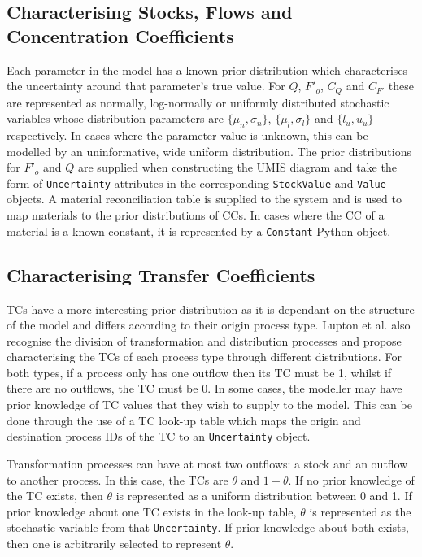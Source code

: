 \documentclass[ %
                    author={Tom Jager},
                supervisor={Dr. Daniel Schien},
                    degree={MEng},
                     title={A Bayesian Inference Engine for Calibrating Uncertainty over UMIS Structured MFA Systems},
                  subtitle={},
                      type={research},
                      year={2019} ]{dissertation}
\begin{document}
\subsection{Characterising Stocks, Flows and Concentration Coefficients}
\label{sec:characterising_stocks_and_flows_and_ccs}
Each parameter in the model has a known prior distribution which characterises the uncertainty around that parameter's true value. For $Q$, $F'_o$, $C_{Q}$ and $C_{F'}$ these are represented as normally, log-normally or uniformly distributed stochastic variables whose distribution parameters are $\{\mu_n, \sigma_n\}$, $\{\mu_l, \sigma_l\}$ and $\{l_u, u_u\}$ respectively. In cases where the parameter value is unknown, this can be modelled by an uninformative, wide uniform distribution. The prior distributions for $F'_o$ and $Q$ are supplied when constructing the UMIS diagram and take the form of \texttt{Uncertainty} attributes in the corresponding \texttt{StockValue} and \texttt{Value} objects. A material reconciliation table is supplied to the system and is used to map materials to the prior distributions of CCs. In cases where the CC of a material is a known constant, it is represented by a \texttt{Constant} Python object. 

\subsection{Characterising Transfer Coefficients}
\label{sec:representing_tcs}
TCs have a more interesting prior distribution as it is dependant on the structure of the model and differs according to their origin process type. Lupton et al. also recognise the division of transformation and distribution processes and propose characterising the TCs of each process type through different distributions. For both types, if a process only has one outflow then its TC must be 1, whilst if there are no outflows, the TC must be 0. In some cases, the modeller may have prior knowledge of TC values that they wish to supply to the model. This can be done through the use of a TC look-up table which maps the origin and destination process IDs of the TC to an \texttt{Uncertainty} object. 

Transformation processes can have at most two outflows: a stock and an outflow to another process. In this case, the TCs are $\theta$ and $1-\theta$. If no prior knowledge of the TC exists, then $\theta$ is represented as a uniform distribution between 0 and 1. If prior knowledge about one TC exists in the look-up table, $\theta$ is represented as the stochastic variable from that \texttt{Uncertainty}. If prior knowledge about both exists, then one is arbitrarily selected to represent $\theta$.
\end{document}

